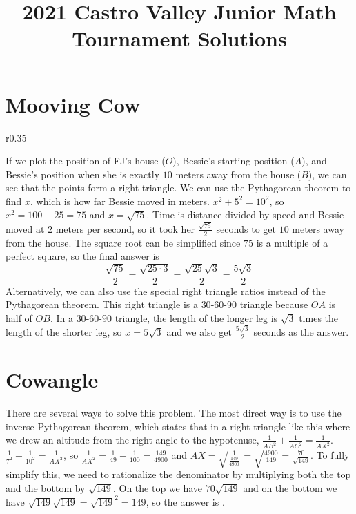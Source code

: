\documentclass{article}
\title{2021 Castro Valley Junior Math Tournament Solutions}
\author{}
\date{}
\begin{document}
\maketitle

\section*{Mooving Cow}
\begin{wrapfigure}{r}{0.35\linewidth}
	\centering
\end{wrapfigure}
If we plot the position of FJ's house ($O$), Bessie's starting position ($A$), and Bessie's position when she is exactly $10$ meters away from the house ($B$), we can see that the points form a right triangle.
We can use the Pythagorean theorem to find $x$, which is how far Bessie moved in meters.
$x^2 + 5^2 = 10^2$, so $x^2 = 100 - 25 = 75$ and $x = \sqrt{75}$.
Time is distance divided by speed and Bessie moved at $2$ meters per second, so it took her $\frac{\sqrt{75}}{2}$ seconds to get $10$ meters away from the house.
The square root can be simplified since $75$ is a multiple of a perfect square, so the final answer is
\[
	\frac{\sqrt{75}}{2} = \frac{\sqrt{25 \cdot 3}}{2} = \frac{\sqrt{25}\sqrt{3}}{2} = \boxed{\frac{5\sqrt{3}}{2}}
\]
Alternatively, we can also use the special right triangle ratios instead of the Pythagorean theorem.
This right triangle is a $30$-$60$-$90$ triangle because $OA$ is half of $OB$.
In a $30$-$60$-$90$ triangle, the length of the longer leg is $\sqrt{3}$ times the length of the shorter leg, so $x = 5\sqrt{3}$ and we also get $\frac{5\sqrt{3}}{2}$ seconds as the answer.

\section*{Cowangle}
There are several ways to solve this problem.
The most direct way is to use the inverse Pythagorean theorem, which states that in a right triangle like this where we drew an altitude from the right angle to the hypotenuse, $\frac{1}{AB^2} + \frac{1}{AC^2} = \frac{1}{AX^2}$.
$\frac{1}{7^2} + \frac{1}{10^2} = \frac{1}{AX^2}$, so $\frac{1}{AX^2} = \frac{1}{49} + \frac{1}{100} = \frac{149}{4900}$ and $AX = \sqrt{\frac{1}{\frac{149}{4900}}} = \sqrt{\frac{4900}{149}} = \frac{70}{\sqrt{149}}$.
To fully simplify this, we need to rationalize the denominator by multiplying both the top and the bottom by $\sqrt{149}$.
On the top we have $70\sqrt{149}$ and on the bottom we have $\sqrt{149}\sqrt{149} = \sqrt{149}^2 = 149$, so the answer is .
\end{document}
